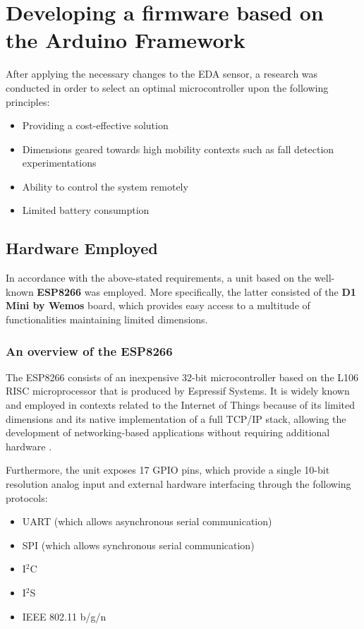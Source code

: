 \section{Developing a firmware based on the Arduino Framework}\label{sec:firmware}

After applying the necessary changes to the EDA sensor, a research was conducted in order to select an optimal microcontroller upon the following principles: 

\begin{itemize}
    \item Providing a cost-effective solution
    \item Dimensions geared towards high mobility contexts such as fall detection experimentations
    \item Ability to control the system remotely
    \item Limited battery consumption
\end{itemize}

\subsection{Hardware Employed}\label{sec:hardware-employed}

In accordance with the above-stated requirements, a unit based on the well-known \textbf{ESP8266} was employed. More specifically, the latter consisted of the \textbf{D1 Mini by Wemos} board, which provides easy access to a multitude of functionalities maintaining limited dimensions.

\subsubsection{An overview of the ESP8266}\label{sec:esp8266}

The ESP8266 consists of an inexpensive 32-bit microcontroller based on the L106 RISC microprocessor that is produced by Espressif Systems. It is widely known and employed in contexts related to the Internet of Things because of its limited dimensions and its native implementation of a full TCP/IP stack, allowing the development of networking-based applications without requiring additional hardware \cite{esp8266}.

Furthermore, the unit exposes 17 GPIO pins, which provide a single 10-bit resolution analog input and external hardware interfacing through the following protocols:

\begin{itemize}
    \item UART (which allows asynchronous serial communication)
    \item SPI (which allows synchronous serial communication)
    \item I$^2$C %
    \item I$^2$S %
    \item IEEE 802.11 b/g/n
\end{itemize}


